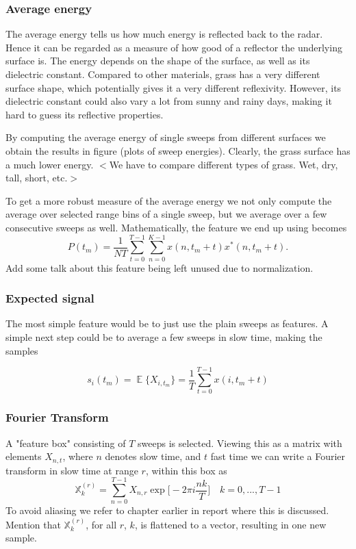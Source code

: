 \documentclass[a4paper, 12pt]{article}
\DeclareMathOperator*{\E}{\mathbb{E}}
\begin{document}
\subsubsection{Average energy}
The average energy tells us how much energy is reflected back to the radar. Hence it can be regarded as a measure of how good of a reflector the underlying surface is. The energy depends on the shape of the surface, as well as its dielectric constant. Compared to other materials, grass has a very different surface shape, which potentially gives it a very different reflexivity. However, its dielectric constant could also vary a lot from sunny and rainy days, making it hard to guess its reflective properties.

By computing the average energy of single sweeps from different surfaces we obtain the results in figure (plots of sweep energies). Clearly, the grass surface has a much lower energy. $<$We have to compare different types of grass. Wet, dry, tall, short, etc.$>$

To get a more robust measure of the average energy we not only compute the average over selected range bins of a single sweep, but we average over a few consecutive sweeps as well. Mathematically, the feature we end up using becomes
\begin{equation}
	P(t_m) = \frac{1}{NT}\sum_{t=0}^{T-1}\sum_{n=0}^{K-1}x(n, t_m + t)x^*(n, t_m + t).
\end{equation}
Add some talk about this feature being left unused due to normalization.




\subsubsection{Expected signal}
The most simple feature would be to just use the plain sweeps as features. A simple next step could be to average a few sweeps in slow time, making the samples 

\begin{equation}
	s_i(t_m) = \E\{X_{i,t_m}\} = \frac{1}{T}\sum_{t=0}^{T-1}x(i, t_m + t)
\end{equation}


\subsubsection{Fourier Transform}
A "feature box" consisting of $T$ sweeps is selected. Viewing this as a matrix with elements $X_{n,t}$, where $n$ denotes slow time, and $t$ fast time we can write a Fourier transform in slow time at range $r$, within this box as
\begin{equation}
	\mathbb{X}_k^{(r)} = \sum_{n=0}^{T-1}X_{n,r}\exp\Big[-2\pi i\frac{nk}{T}\Big] \quad k=0, ..., T-1
\end{equation}
To avoid aliasing we refer to chapter earlier in report where this is discussed. Mention that $\mathbb{X}_k^{(r)}$, for all $r$, $k$, is flattened to a vector, resulting in one new sample.
\end{document}
